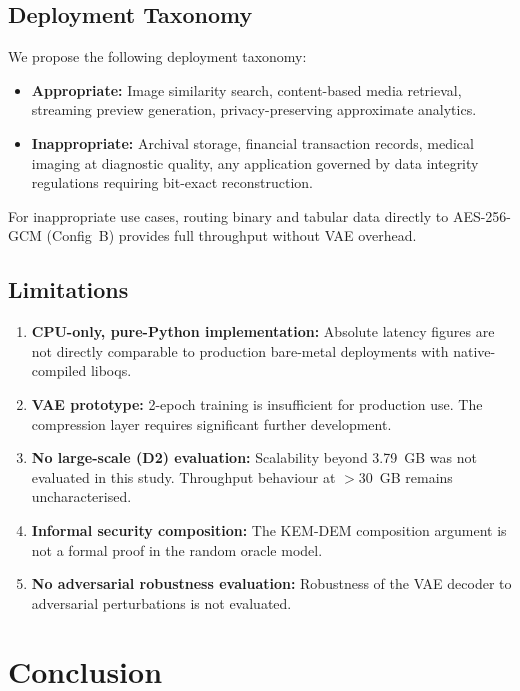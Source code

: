 \documentclass[twocolumn]{article}
\begin{document}
\subsection{Deployment Taxonomy}

We propose the following deployment taxonomy:
\begin{itemize}
  \item \textbf{Appropriate:} Image similarity search, content-based media
  retrieval, streaming preview generation, privacy-preserving approximate analytics.
  \item \textbf{Inappropriate:} Archival storage, financial transaction records,
  medical imaging at diagnostic quality, any application governed by data integrity
  regulations requiring bit-exact reconstruction.
\end{itemize}

For inappropriate use cases, routing binary and tabular data directly to
AES-256-GCM (Config~B) provides full throughput without VAE overhead.

\subsection{Limitations}

\begin{enumerate}
  \item \textbf{CPU-only, pure-Python implementation:} Absolute latency figures
  are not directly comparable to production bare-metal deployments with
  native-compiled liboqs.
  \item \textbf{VAE prototype:} 2-epoch training is insufficient for production
  use. The compression layer requires significant further development.
  \item \textbf{No large-scale (D2) evaluation:} Scalability beyond 3.79~GB was
  not evaluated in this study. Throughput behaviour at $>$30~GB remains
  uncharacterised.
  \item \textbf{Informal security composition:} The KEM-DEM composition argument
  is not a formal proof in the random oracle model.
  \item \textbf{No adversarial robustness evaluation:} Robustness of the VAE
  decoder to adversarial perturbations is not evaluated.
\end{enumerate}

\section{Conclusion}
\end{document}
